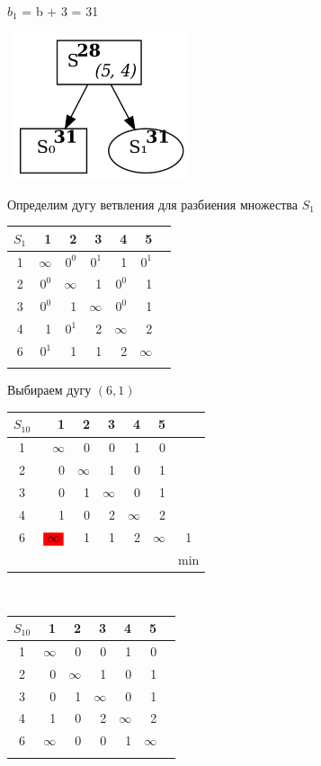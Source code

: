 \documentclass[12pt]{article}
\begin{document}
$b_1$ = b + 3 = 31\\
\begin{flushleft}
 
\includegraphics[width = 5.5cm, height = 4.3cm]{pictures/picture_14.jpg}
\end{flushleft}

\vspace{4cm}
Определим дугу ветвления для разбиения множества $S_1$

\begin{flushleft}
\begin{tabular}{c||rrrrr||c}
$S_1$ & 1 & 2 & 3 & 4 & 5 & \\
\hline
\hline
1 & $\infty$ & $0^0$ & $0^1$  & 1 & $0^1$ & \\
2 & $0^0$ & $\infty$ & 1  & $0^0$ & 1 & \\
3 & $0^0$ & 1 & $\infty$  & $0^0$ & 1 & \\
4 & 1 & $0^1$ & 2  & $\infty$ & 2 & \\
6 & $0^1$ & 1 & 1  & 2 & $\infty$ & \\
\hline
\hline
 & &  &  &  & & \\
\end{tabular}
\end{flushleft}

Выбираем дугу $(6,1)$ 

\begin{flushleft}
\begin{tabular}{c||rrrrr||c}
$S_{10}$ & 1 & 2 & 3 & 4 & 5 & \\
\hline
\hline
1 & $\infty$ & 0 & 0  & 1 & 0 & \\
2 & 0 & $\infty$ & 1  & 0 & 1 & \\
3 & 0 & 1 & $\infty$  & 0 & 1 & \\
4 & 1 & 0 & 2  & $\infty$ & 2 & \\
6 & $\colorbox{red}{$\infty$}$ & 1 & 1  & 2 & $\infty$ & 1\\
\hline
\hline
 &  &  &  &  & & min \\
\end{tabular}
$\qquad $  
\begin{tabular}{c||rrrrr||c}
$S_{10}$ & 1 & 2 & 3 & 4 & 5 & \\
\hline
\hline
1 & $\infty$ & 0 & 0  & 1 & 0 & \\
2 & 0 & $\infty$ & 1  & 0 & 1 & \\
3 & 0 & 1 & $\infty$  & 0 & 1 & \\
4 & 1 & 0 & 2  & $\infty$ & 2 & \\
    6 & $\infty$ & 0 & 0  & 1 & $\infty$ & \\
\hline
\hline
 & &  &  &  & & \\
\end{tabular}
\end{flushleft}
\end{document}
